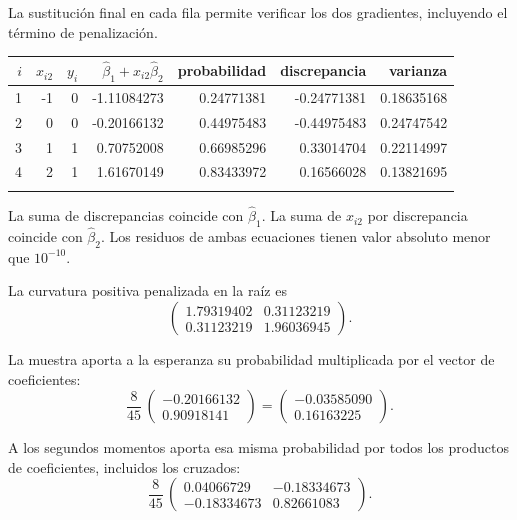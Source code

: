 \documentclass[11pt,a4paper]{article}
\begin{document}
La sustitución final en cada fila permite verificar
los dos gradientes, incluyendo el término de penalización.
\begin{center}\scriptsize
\begin{tabular}{rrrrrrr}\toprule
\(i\)&\(x_{i2}\)&\(y_i\)&\(\widehat\beta_1+x_{i2}\widehat\beta_2\)&probabilidad&discrepancia&varianza\\\midrule
1&-1&0&-1.11084273&0.24771381&-0.24771381&0.18635168\\
2&0&0&-0.20166132&0.44975483&-0.44975483&0.24747542\\
3&1&1&0.70752008&0.66985296&0.33014704&0.22114997\\
4&2&1&1.61670149&0.83433972&0.16566028&0.13821695\\
\\\bottomrule\end{tabular}\end{center}
La suma de discrepancias coincide con \(\widehat\beta_1\).
La suma de \(x_{i2}\) por discrepancia coincide con
\(\widehat\beta_2\). Los residuos de ambas ecuaciones
tienen valor absoluto menor que \(10^{-10}\).

La curvatura positiva penalizada en la raíz es
\[
\begin{pmatrix}1.79319402&0.31123219\\0.31123219&1.96036945\end{pmatrix}.
\]

La muestra aporta a la esperanza su probabilidad
multiplicada por el vector de coeficientes:
\[
\frac{8}{45}\,\begin{pmatrix}-0.20166132\\0.90918141\end{pmatrix}=\begin{pmatrix}-0.03585090\\0.16163225\end{pmatrix}.
\]

A los segundos momentos aporta esa misma probabilidad
por todos los productos de coeficientes, incluidos los cruzados:
\[
\frac{8}{45}\,\begin{pmatrix}0.04066729&-0.18334673\\-0.18334673&0.82661083\end{pmatrix}.
\]
\end{document}
